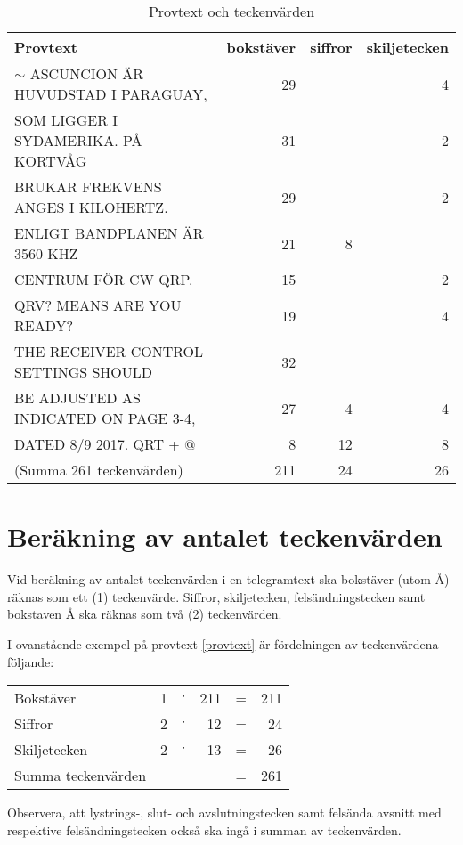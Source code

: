 \begin{table*}[t]
  \begin{center}
    \begin{tabular}{l|r|r|r|}
	Provtext & bokstäver & siffror & skiljetecken\\ \hline
	$\sim$ ASCUNCION ÄR HUVUDSTAD I PARAGUAY, & 29 & & 4\\
	SOM LIGGER I SYDAMERIKA. PÅ KORTVÅG & 31 & & 2\\
	BRUKAR FREKVENS ANGES I KILOHERTZ. & 29 & & 2\\
	ENLIGT BANDPLANEN ÄR 3560 KHZ & 21 & 8 &\\
	CENTRUM FÖR CW QRP. & 15& & 2\\
	QRV? MEANS ARE YOU READY? & 19 & & 4 \\
	THE RECEIVER CONTROL SETTINGS SHOULD & 32 & &\\
	BE ADJUSTED AS INDICATED ON PAGE 3-4, & 27 & 4 & 4\\
	DATED 8/9 2017. QRT + @ & 8 & 12 & 8\\ \hline
	(Summa 261 teckenvärden)& 211 & 24 & 26\\
    \end{tabular}
    \caption{Provtext och teckenvärden}
    \label{tab:provtext}
  \end{center}
\end{table*}

\section[Teckenvärden]{Beräkning av antalet teckenvärden}

Vid beräkning av antalet teckenvärden i en telegramtext ska bokstäver (utom Å)
räknas som ett (1) teckenvärde.
Siffror, skiljetecken, felsändningstecken samt bokstaven Å ska räknas som två
(2) teckenvärden.

I ovanstående exempel på provtext \ref{provtext} är fördelningen av
teckenvärdena följande:

\begin{tabular}{lrcrcr}
	Bokstäver          & 1 & $\cdot$ & 211 & = & 211 \\
	Siffror            & 2 & $\cdot$ & 12  & = & 24  \\
	Skiljetecken       & 2 & $\cdot$ & 13  & = & 26  \\
	Summa teckenvärden &   &         &     & = & 261
\end{tabular}

Observera, att lystrings-, slut- och avslutningstecken samt felsända avsnitt med
respektive felsändningstecken också ska ingå i summan av teckenvärden.

